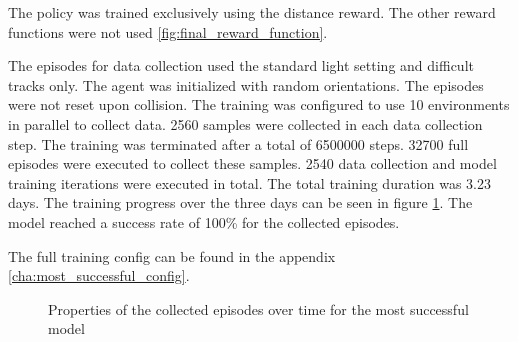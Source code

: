 The policy was trained exclusively using the distance reward. The other reward functions were not used \ref{fig:final_reward_function}.

The episodes for data collection used the standard light setting and difficult tracks only. The agent was initialized with random orientations. The episodes were not reset upon collision.
The training was configured to use 10 environments in parallel to collect data. 2560 samples were collected in each data collection step. The training was terminated after a total of 6500000 steps. 32700 full episodes were executed to collect these samples. 2540 data collection and model training iterations were executed in total. The total training duration was 3.23 days.
The training progress over the three days can be seen in figure \ref{fig:training_most_successful_model}. The model reached a success rate of 100\% for the collected episodes.

The full training config can be found in the appendix \ref{cha:most_successful_config}.

\begin{figure}
    \centering
    \caption{Properties of the collected episodes over time for the most successful model}
    \label{fig:training_most_successful_model}
\end{figure}